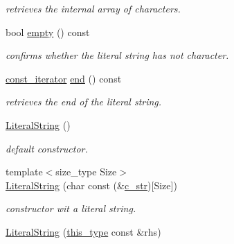\begin{DoxyCompactItemize}
\begin{DoxyCompactList}\small\item\em retrieves the internal array of characters. \end{DoxyCompactList}\item 
\hypertarget{classhryky_1_1_literal_string_aa9961730c593be80845023f8ce732b6d}{bool \hyperlink{classhryky_1_1_literal_string_aa9961730c593be80845023f8ce732b6d}{empty} () const }\label{classhryky_1_1_literal_string_aa9961730c593be80845023f8ce732b6d}

\begin{DoxyCompactList}\small\item\em confirms whether the literal string has not character. \end{DoxyCompactList}\item 
\hypertarget{classhryky_1_1_literal_string_a80708a1b13bd6d63d10c08589f6cddd2}{\hyperlink{classhryky_1_1iterator_1_1random_1_1_immutable}{const\-\_\-iterator} \hyperlink{classhryky_1_1_literal_string_a80708a1b13bd6d63d10c08589f6cddd2}{end} () const }\label{classhryky_1_1_literal_string_a80708a1b13bd6d63d10c08589f6cddd2}

\begin{DoxyCompactList}\small\item\em retrieves the end of the literal string. \end{DoxyCompactList}\item 
\hypertarget{classhryky_1_1_literal_string_a2a4124b3bdb4cef9b2d71b318b702038}{\hyperlink{classhryky_1_1_literal_string_a2a4124b3bdb4cef9b2d71b318b702038}{Literal\-String} ()}\label{classhryky_1_1_literal_string_a2a4124b3bdb4cef9b2d71b318b702038}

\begin{DoxyCompactList}\small\item\em default constructor. \end{DoxyCompactList}\item 
{\footnotesize template$<$size\-\_\-type Size$>$ }\\\hyperlink{classhryky_1_1_literal_string_a49f738a4ab21416ad537d0e21a64b8bd}{Literal\-String} (char const (\&\hyperlink{classhryky_1_1_literal_string_af5e08a81b6cff4ccbc3f0fe190aa6a14}{c\-\_\-str})\mbox{[}Size\mbox{]})
\begin{DoxyCompactList}\small\item\em constructor wit a literal string. \end{DoxyCompactList}\item 
\hypertarget{classhryky_1_1_literal_string_a7ecaf06bbe60edaa37dd0e5439b4daff}{\hyperlink{classhryky_1_1_literal_string_a7ecaf06bbe60edaa37dd0e5439b4daff}{Literal\-String} (\hyperlink{classhryky_1_1_literal_string}{this\-\_\-type} const \&rhs)}\label{classhryky_1_1_literal_string_a7ecaf06bbe60edaa37dd0e5439b4daff}


\end{DoxyCompactItemize}
